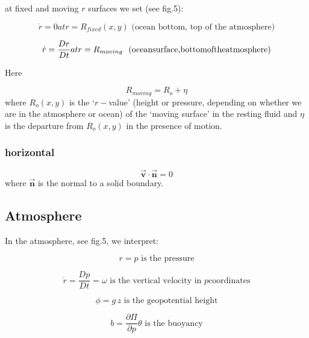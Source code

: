 \documentclass[12pt]{book}
\begin{document}
at fixed and moving $r$ surfaces we set (see fig.5):

\begin{equation}
\dot{r}=0atr=R_{fixed}(x,y)\text{ (ocean bottom, top of the atmosphere)}
\label{eq:fixedbc}
\end{equation}

\begin{equation}
\dot{r}=\frac{Dr}{Dt}atr=R_{moving}\text{ \
(oceansurface,bottomoftheatmosphere)}  \label{eq:movingbc}
\end{equation}

Here

\begin{equation*}
R_{moving}=R_{o}+\eta
\end{equation*}
where $R_{o}(x,y)$ is the `$r-$value' (height or pressure, depending on
whether we are in the atmosphere or ocean) of the `moving surface' in the
resting fluid and $\eta $ is the departure from $R_{o}(x,y)$ in the presence
of motion.

\subsubsection{horizontal}

\begin{equation}
\vec{\mathbf{v}}\cdot \vec{\mathbf{n}}=0  \label{eq:noflow}
\end{equation}
where $\vec{\mathbf{n}}$ is the normal to a solid boundary.

\subsection{Atmosphere}

In the atmosphere, see fig.5, we interpret:

\begin{equation}
r=p\text{ is the pressure}  \label{eq:atmos-r}
\end{equation}

\begin{equation}
\dot{r}=\frac{Dp}{Dt}=\omega \text{ is the vertical velocity in }p\text{
coordinates}  \label{eq:atmos-omega}
\end{equation}

\begin{equation}
\phi =g\,z\text{ is the geopotential height}  \label{eq:atmos-phi}
\end{equation}

\begin{equation}
b=\frac{\partial \Pi }{\partial p}\theta \text{ is the buoyancy}
\label{eq:atmos-b}
\end{equation}
\end{document}
